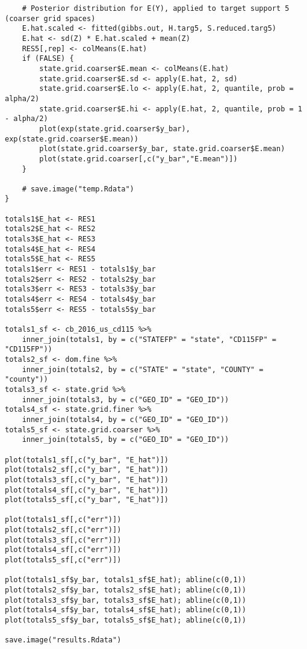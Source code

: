 \documentclass[12pt]{article}
\begin{document}
\begin{scriptsize}
\begin{verbatim}
    # Posterior distribution for E(Y), applied to target support 5 (coarser grid spaces)
    E.hat.scaled <- fitted(gibbs.out, H.targ5, S.reduced.targ5)
    E.hat <- sd(Z) * E.hat.scaled + mean(Z)
    RES5[,rep] <- colMeans(E.hat)
    if (FALSE) {
        state.grid.coarser$E.mean <- colMeans(E.hat)
        state.grid.coarser$E.sd <- apply(E.hat, 2, sd)
        state.grid.coarser$E.lo <- apply(E.hat, 2, quantile, prob = alpha/2)
        state.grid.coarser$E.hi <- apply(E.hat, 2, quantile, prob = 1 - alpha/2)
        plot(exp(state.grid.coarser$y_bar), exp(state.grid.coarser$E.mean))
        plot(state.grid.coarser$y_bar, state.grid.coarser$E.mean)
        plot(state.grid.coarser[,c("y_bar","E.mean")])
    }

    # save.image("temp.Rdata")
}

totals1$E_hat <- RES1
totals2$E_hat <- RES2
totals3$E_hat <- RES3
totals4$E_hat <- RES4
totals5$E_hat <- RES5
totals1$err <- RES1 - totals1$y_bar
totals2$err <- RES2 - totals2$y_bar
totals3$err <- RES3 - totals3$y_bar
totals4$err <- RES4 - totals4$y_bar
totals5$err <- RES5 - totals5$y_bar

totals1_sf <- cb_2016_us_cd115 %>%
    inner_join(totals1, by = c("STATEFP" = "state", "CD115FP" = "CD115FP"))
totals2_sf <- dom.fine %>%
    inner_join(totals2, by = c("STATE" = "state", "COUNTY" = "county"))
totals3_sf <- state.grid %>%
    inner_join(totals3, by = c("GEO_ID" = "GEO_ID"))
totals4_sf <- state.grid.finer %>%
    inner_join(totals4, by = c("GEO_ID" = "GEO_ID"))
totals5_sf <- state.grid.coarser %>%
    inner_join(totals5, by = c("GEO_ID" = "GEO_ID"))

plot(totals1_sf[,c("y_bar", "E_hat")])
plot(totals2_sf[,c("y_bar", "E_hat")])
plot(totals3_sf[,c("y_bar", "E_hat")])
plot(totals4_sf[,c("y_bar", "E_hat")])
plot(totals5_sf[,c("y_bar", "E_hat")])

plot(totals1_sf[,c("err")])
plot(totals2_sf[,c("err")])
plot(totals3_sf[,c("err")])
plot(totals4_sf[,c("err")])
plot(totals5_sf[,c("err")])

plot(totals1_sf$y_bar, totals1_sf$E_hat); abline(c(0,1))
plot(totals2_sf$y_bar, totals2_sf$E_hat); abline(c(0,1))
plot(totals3_sf$y_bar, totals3_sf$E_hat); abline(c(0,1))
plot(totals4_sf$y_bar, totals4_sf$E_hat); abline(c(0,1))
plot(totals5_sf$y_bar, totals5_sf$E_hat); abline(c(0,1))

save.image("results.Rdata")
\end{verbatim}
\end{scriptsize}
\end{document}
